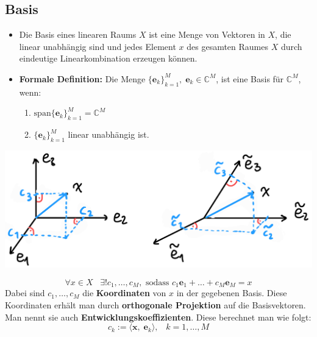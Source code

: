 \documentclass[11pt]{article}
\begin{document}
\subsection*{Basis}
\vspace*{-0.5cm}
\begin{itemize}[leftmargin=0pt]
    \item[] Die Basis eines linearen Raums $X$ ist eine Menge von Vektoren in $X$, die linear unabhängig sind und jedes Element $x$ des gesamten Raumes $X$ durch eindeutige Linearkombination erzeugen können.
    \item[] \textbf{Formale Definition:} Die Menge $\{\mathbf{e}_k\}_{k=1}^M, \; \mathbf{e}_k \in \mathbb{C}^M$, ist eine Basis für $\mathbb{C}^M$, wenn:
    \begin{enumerate}
        \item $\text{span}\{\mathbf{e}_k\}_{k=1}^M = \mathbb{C}^M$
        \item $\{\mathbf{e}_k\}_{k=1}^M$ linear unabhängig ist.
    \end{enumerate}
\end{itemize}

\begin{center}
    \vspace*{-0.8cm}
    \includegraphics[width=0.6\linewidth]{docimgs/Basen.jpg}
\end{center}

\vspace*{-1cm}
$$\forall x \in X \hspace{10pt} \exists ! c_1, \dots, c_M, \text{ sodass } c_1 \mathbf{e}_1 + \dots + c_M \mathbf{e}_M = x$$
Dabei sind $c_1, \dots, c_M$ die \textbf{Koordinaten} von $x$ in der gegebenen Basis. Diese Koordinaten erhält man durch \textbf{orthogonale Projektion} auf die Basisvektoren. Man nennt sie auch \textbf{Entwicklungskoeffizienten}. Diese berechnet man wie folgt:
$$c_k := \langle \mathbf{x}, \; \mathbf{e}_k \rangle, \hspace{10pt} k=1, \dots, M$$
\end{document}
